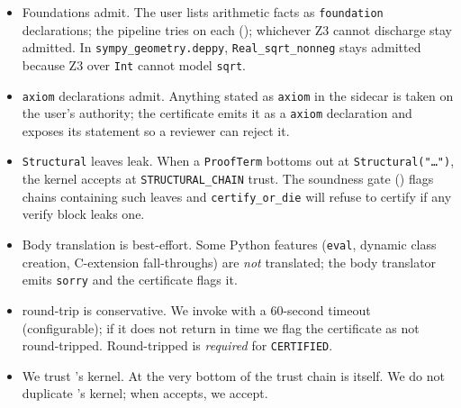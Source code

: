 \begin{itemize}[leftmargin=1.7em]
  \item Foundations admit.  The user lists arithmetic facts as
    \texttt{foundation} declarations; the pipeline tries \Zthree{} on
    each (); whichever Z3 cannot discharge stay
    admitted.  In \texttt{sympy\_geometry.deppy}, \texttt{Real\_sqrt\_nonneg}
    stays admitted because Z3 over \texttt{Int} cannot model
    \texttt{sqrt}.

  \item \texttt{axiom} declarations admit.  Anything stated as
    \texttt{axiom} in the sidecar is taken on the user's authority;
    the certificate emits it as a \Lean{} \texttt{axiom} declaration
    and exposes its statement so a reviewer can reject it.

  \item \texttt{Structural} leaves leak.  When a \texttt{ProofTerm}
    bottoms out at \texttt{Structural("\dots")}, the kernel accepts at
    \texttt{STRUCTURAL\_CHAIN} trust.  The soundness gate
    () flags chains containing such leaves and
    \texttt{certify\_or\_die} will refuse to certify if any verify
    block leaks one.

  \item Body translation is best-effort.  Some Python features
    (\texttt{eval}, dynamic class creation, C-extension fall-throughs)
    are \emph{not} translated; the body translator emits
    \texttt{sorry} and the certificate flags it.

  \item \Lean{} round-trip is conservative.  We invoke \Lean{} with a
    60-second timeout (configurable); if it does not return in time we
    flag the certificate as not round-tripped.  Round-tripped is
    \emph{required} for \texttt{CERTIFIED}.

  \item We trust \Lean's kernel.  At the very bottom of the trust
    chain is \Lean{} itself.  We do not duplicate \Lean's kernel;
    when \Lean{} accepts, we accept.
\end{itemize}
